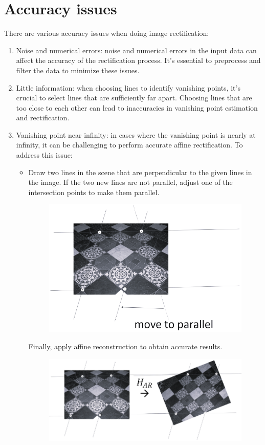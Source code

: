 \documentclass[12pt, a4paper]{report}
\begin{document}
    \section{Accuracy issues}
    There are various accuracy issues when doing image rectification: 
    \begin{enumerate}
        \item Noise and numerical errors: noise and numerical errors in the input data can affect the accuracy of the rectification process. 
            It's essential to preprocess and filter the data to minimize these issues.
        \item Little information: when choosing lines to identify vanishing points, it's crucial to select lines that are sufficiently far apart. 
            Choosing lines that are too close to each other can lead to inaccuracies in vanishing point estimation and rectification.
        \item Vanishing point near infinity: in cases where the vanishing point is nearly at infinity, it can be challenging to perform accurate affine rectification. 
            To address this issue:
            \begin{itemize}
                \item Draw two lines in the scene that are perpendicular to the given lines in the image.
                    If the two new lines are not parallel, adjust one of the intersection points to make them parallel.
                    \begin{figure}[H]
                        \centering
                        \includegraphics[width=0.4\linewidth]{images/vpi.png}
                    \end{figure}
                    Finally, apply affine reconstruction to obtain accurate results. 
                    \begin{figure}[H]
                        \centering
                        \includegraphics[width=0.5\linewidth]{images/ar.png}

\end{figure}
\end{itemize}
\end{enumerate}
\end{document}
